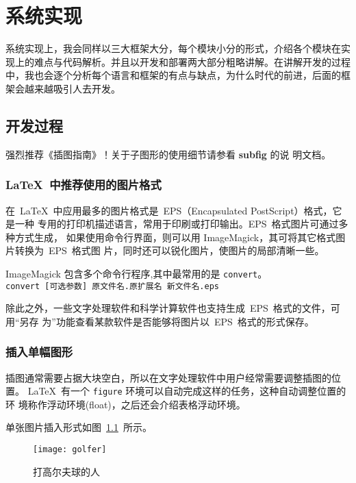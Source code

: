 \chapter{系统实现}
\label{cha:example}

系统实现上，我会同样以三大框架大分，每个模块小分的形式，介绍各个模块在实现上的难点与代码解析。并且以开发和部署两大部分粗略讲解。在讲解开发的过程中，我也会逐个分析每个语言和框架的有点与缺点，为什么时代的前进，后面的框架会越来越吸引人去开发。

\section{开发过程}
\label{sec:figure}

强烈推荐《\LaTeXe 插图指南》！关于子图形的使用细节请参看 \textbf{subfig} 的说
明文档。

\subsection{\LaTeX~中推荐使用的图片格式}

在~\LaTeX~中应用最多的图片格式是~EPS（Encapsulated PostScript）格式，它是一种
专用的打印机描述语言，常用于印刷或打印输出。EPS~格式图片可通过多种方式生成，
如果使用命令行界面，则可以用 ImageMagick，其可将其它格式图片转换为~EPS~格式图
片，同时还可以锐化图片，使图片的局部清晰一些。

ImageMagick 包含多个命令行程序,其中最常用的是 \texttt{convert}。\\
\verb|convert [可选参数] 原文件名.原扩展名 新文件名.eps|

除此之外，一些文字处理软件和科学计算软件也支持生成~EPS~格式的文件，可用“另存
为”功能查看某款软件是否能够将图片以~EPS~格式的形式保存。

\subsection{插入单幅图形}

插图通常需要占据大块空白，所以在文字处理软件中用户经常需要调整插图的位置。
\LaTeX~有一个 \texttt{figure} 环境可以自动完成这样的任务，这种自动调整位置的环
境称作浮动环境(float)，之后还会介绍表格浮动环境。

单张图片插入形式如图~\ref{fig:golfer}~所示。
\begin{figure}[htbp]
\centering
\texttt{[image: golfer]}
\caption{打高尔夫球的人}
\label{fig:golfer}
\end{figure}

